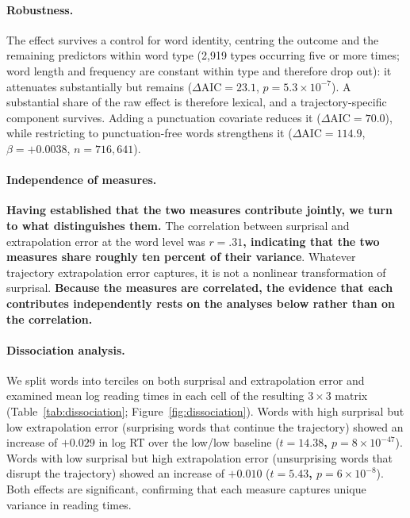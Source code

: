 \documentclass[12pt]{article}
\newcommand{\new}[1]{{\bfseries #1}}
\begin{document}
\new{\paragraph{Robustness.} The effect survives a control for word identity, centring the outcome and the remaining predictors within word type (2,919 types occurring five or more times; word length and frequency are constant within type and therefore drop out): it attenuates substantially but remains ($\Delta\text{AIC} = 23.1$, $p = 5.3 \times 10^{-7}$). A substantial share of the raw effect is therefore lexical, and a trajectory-specific component survives. Adding a punctuation covariate reduces it ($\Delta\text{AIC} = 70.0$), while restricting to punctuation-free words strengthens it ($\Delta\text{AIC} = 114.9$, $\beta = +0.0038$, $n = 716{,}641$).}

\paragraph{Independence of measures.} \new{Having established that the two measures contribute jointly, we turn to what distinguishes them.} The correlation between surprisal and extrapolation error at the word level was \new{$r = .31$, indicating that the two measures share roughly ten percent of their variance}. Whatever trajectory extrapolation error captures, it is not a nonlinear transformation of surprisal. \new{Because the measures are correlated, the evidence that each contributes independently rests on the analyses below rather than on the correlation.}

\paragraph{Dissociation analysis.} We split words into terciles on both surprisal and extrapolation error and examined mean log reading times in each cell of the resulting $3 \times 3$ matrix (Table~\ref{tab:dissociation}; Figure~\ref{fig:dissociation}). Words with high surprisal but low extrapolation error (surprising words that continue the trajectory) showed an increase of \new{$+0.029$} in log RT over the low/low baseline (\new{$t = 14.38$, $p = 8 \times 10^{-47}$}). Words with low surprisal but high extrapolation error (unsurprising words that disrupt the trajectory) showed an increase of \new{$+0.010$} (\new{$t = 5.43$, $p = 6 \times 10^{-8}$}). Both effects are significant, confirming that each measure captures unique variance in reading times.
\end{document}
